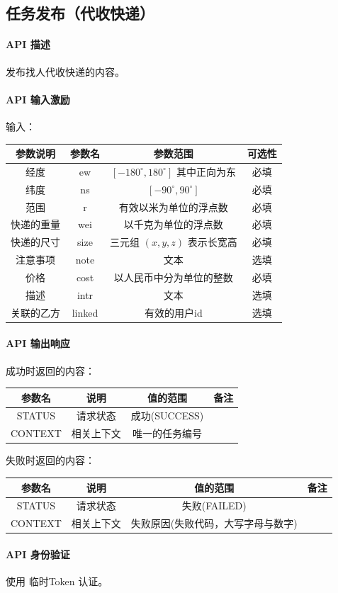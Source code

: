 \documentclass[UTF8]{article}
\def\apiintr{\paragraph{\colorbox[rgb]{1.0,0.6,0.65}{API 描述}}} %
\def\apiexc{\paragraph{\colorbox[rgb]{1,0.85,0.45}{API 输入激励}}} %
\def\apiresp{\paragraph{\colorbox[rgb]{0.9,0.9,1}{API 输出响应}}} %
\def\apiauth{\paragraph{\colorbox[rgb]{0.45,0.9,1}{API 身份验证}}} %
\def\失败{\colorbox[rgb]{1,0.5,0.5}{失败}}
\def\成功{\colorbox[rgb]{0.4,1,0.5}{成功}}
\def\成功V{成功(SUCCESS)}
\def\失败V{失败(FAILED)}
\def\失败原因{失败原因(失败代码，大写字母与数字)}
\begin{document}
    \subsection{任务发布（代收快递）}
    \apiintr
    发布找人代收快递的内容。
    \apiexc
    输入：\\
    \begin{tabular}{|c|c|c|c|}
        \hline \rule[-2ex]{0pt}{5.5ex} 参数说明 & 参数名 & 参数范围 & 可选性 \\
        \hline \rule[-2ex]{0pt}{5.5ex} 经度 & ew & $[-180^\circ,180^\circ]$ 其中正向为东 & 必填 \\
        \hline \rule[-2ex]{0pt}{5.5ex} 纬度 & ns & $[-90^\circ,90^\circ]$ & 必填 \\
        \hline \rule[-2ex]{0pt}{5.5ex} 范围 & r & 有效以米为单位的浮点数 & 必填 \\
        \hline \rule[-2ex]{0pt}{5.5ex} 快递的重量 & wei & 以千克为单位的浮点数 & 必填 \\
        \hline \rule[-2ex]{0pt}{5.5ex} 快递的尺寸 & size & 三元组 $(x,y,z)$ 表示长宽高 & 必填 \\
        \hline \rule[-2ex]{0pt}{5.5ex} 注意事项 & note & 文本 & 选填 \\
        \hline \rule[-2ex]{0pt}{5.5ex} 价格 & cost & 以人民币中分为单位的整数 & 必填 \\
        \hline \rule[-2ex]{0pt}{5.5ex} 描述 & intr & 文本 & 选填 \\
        \hline \rule[-2ex]{0pt}{5.5ex} 关联的乙方 & linked & 有效的用户id & 选填 \\
        \hline 
    \end{tabular}
    \apiresp
    \成功 时返回的内容：\\
    \begin{tabular}{|c|c|c|c|}
        \hline \rule[-2ex]{0pt}{5.5ex} 参数名 & 说明 & 值的范围 & 备注 \\
        \hline \rule[-2ex]{0pt}{5.5ex} STATUS & 请求状态 & \成功V &  \\ 
        \hline \rule[-2ex]{0pt}{5.5ex} CONTEXT & 相关上下文 & 唯一的任务编号 &  \\
        \hline 
    \end{tabular} 
    \par \失败 时返回的内容：\\
    \begin{tabular}{|c|c|c|c|}
        \hline \rule[-2ex]{0pt}{5.5ex} 参数名 & 说明 & 值的范围 & 备注 \\
        \hline \rule[-2ex]{0pt}{5.5ex} STATUS & 请求状态 & \失败V &  \\ 
        \hline \rule[-2ex]{0pt}{5.5ex} CONTEXT & 相关上下文 & \失败原因 &  \\
        \hline 
    \end{tabular}
    \apiauth
    使用 临时Token 认证。
\end{document}
